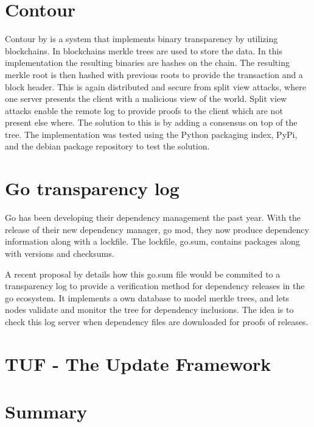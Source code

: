 \documentclass[../Main/thesis.tex]{subfiles}
\begin{document}
\section{Contour}\label{sec:contour}
Contour by \citeauthor{1712.08427v2} is a system that implements binary
transparency by utilizing blockchains. In blockchains merkle trees are used to
store the data. In this implementation the resulting binaries are hashes on the
chain. The resulting merkle root is then hashed with previous roots to provide
the transaction and a block header. This is again distributed and secure from
split view attacks, where one server presents the client with a malicious view
of the world. Split view attacks enable the remote log to provide proofs to the
client which are not present else where. The solution to this is by adding a
consensus on top of the tree. The implementation was tested using the Python
packaging index, PyPi, and the debian package repository to test the solution.\cite{1712.08427v2}


\section{Go transparency log}\label{sec:go-transparency-log}
Go has been developing their dependency management the past year. With the
release of their new dependency manager, go mod, they now produce dependency
information along with a lockfile. The lockfile, go.sum, contains packages along
with versions and checksums.

A recent proposal by \citeauthor{russ-cos-and-filippo-valsorda} details how this
go.sum file would be commited to a transparency log to provide a verification
method for dependency releases in the go ecosystem. It implements a own database
to model merkle trees, and lets nodes validate and monitor the tree for
dependency inclusions. The idea is to check this log server when dependency
files are downloaded for proofs of releases.\cite{russ-cos-and-filippo-valsorda}

\section{TUF - The Update Framework}\label{sec:tuf}

\section*{Summary}\label{sec:researchoverview-summary}

\blankpage
\end{document}
